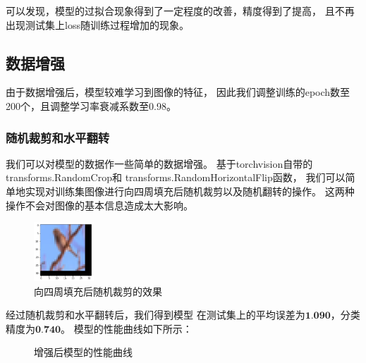 \documentclass[UTF8]{ctexart}
\begin{document}
可以发现，模型的过拟合现象得到了一定程度的改善，精度得到了提高，
且不再出现测试集上loss随训练过程增加的现象。

\subsection{数据增强}
由于数据增强后，模型较难学习到图像的特征，
因此我们调整训练的epoch数至200个，且调整学习率衰减系数至0.98。

\subsubsection{随机裁剪和水平翻转}
我们可以对模型的数据作一些简单的数据增强。
基于torchvision自带的transforms.RandomCrop和
transforms.RandomHorizontalFlip函数，
我们可以简单地实现对训练集图像进行向四周填充后随机裁剪以及随机翻转的操作。
这两种操作不会对图像的基本信息造成太大影响。

\begin{figure}[htbp]
    \centering
    \includegraphics[width=0.20\textwidth]{../img/1-4.png}
    \caption{向四周填充后随机裁剪的效果}
\end{figure}

经过随机裁剪和水平翻转后，我们得到模型
在测试集上的平均误差为$\textbf{1.090}$，分类精度为$\textbf{0.740}$。
模型的性能曲线如下所示：

\begin{figure}[htbp]
    \centering
    \hspace{0.5in}
    \caption{增强后模型的性能曲线}
\end{figure}
\end{document}
